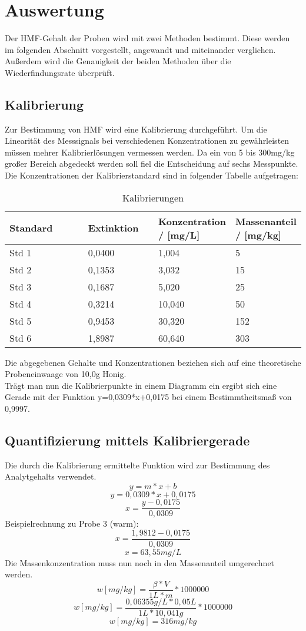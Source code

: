 \chapter{Auswertung}
Der HMF-Gehalt der Proben wird mit zwei Methoden bestimmt. Diese werden im folgenden Abschnitt vorgestellt, angewandt und miteinander verglichen. Außerdem wird die Genauigkeit der beiden Methoden über die Wiederfindungsrate überprüft.
\section{Kalibrierung}
Zur Bestimmung von HMF wird eine Kalibrierung durchgeführt. Um die Linearität des Messsignals bei verschiedenen Konzentrationen zu gewährleisten müssen mehrer Kalibrierlösungen vermessen werden. Da ein von 5 bis 300mg/kg großer Bereich abgedeckt werden soll fiel die Entscheidung auf sechs Messpunkte. Die Konzentrationen der Kalibrierstandard sind in folgender Tabelle aufgetragen:

\begin{table}[htbp]
	\centering
		\begin{tabular}{p{0.30\linewidth}|p{0.25\linewidth}|p{0.25\linewidth}|p{0.2\linewidth}}
			Standard & Extinktion & Konzentration / [mg/L] &  Massenanteil / [mg/kg]\\
			\hline
			Std 1 & 0,0400 & 1,004 & 5\\
			\hline
			Std 2 & 0,1353 & 3,032 & 15\\
			\hline
			Std 3 & 0,1687 & 5,020 & 25\\
			\hline
			Std 4 & 0,3214 & 10,040 & 50\\
			\hline
			Std 5 & 0,9453 & 30,320 & 152\\
			\hline
			Std 6 & 1,8987 & 60,640 & 303
		\end{tabular}
	\caption{Kalibrierungen}
	\label{tab:Kalibrierungen}
\end{table}

Die abgegebenen Gehalte und Konzentrationen beziehen sich auf eine theoretische Probeneinwaage von 10,0g Honig.\\
Trägt man nun die Kalibrierpunkte in einem Diagramm ein ergibt sich eine Gerade mit der Funktion y=0,0309*x+0,0175 bei einem Bestimmtheitsmaß von 0,9997.

\section{Quantifizierung mittels Kalibriergerade}
Die durch die Kalibrierung ermittelte Funktion wird zur Bestimmung des Analytgehalts verwendet.
	\[y=m*x+b\]
	\[y=0,0309*x+0,0175\]
	\[x=\frac{ y-0,0175 }{ 0,0309 }\]
Beispielrechnung zu Probe 3 (warm):
	\[x=\frac{ 1,9812-0,0175 }{ 0,0309 }\]
	\[x=63,55mg/L\]
Die Massenkonzentration muss nun noch in den Massenanteil umgerechnet werden.
	\[w[mg/kg]=\frac{ \beta*V }{ 1L * m }*1000000\]
	\[w[mg/kg]=\frac{ 0,06355g/L*0,05L }{ 1L * 10,041g }*1000000\]
	\[w[mg/kg]=316mg/kg\]

